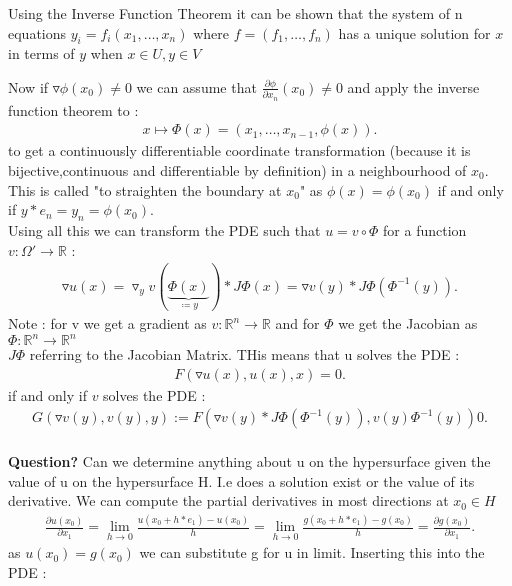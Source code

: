 \begin{corollary}
 Using the Inverse Function Theorem it can be shown that the system of n equations $y_{i}=f_i(x_1,\ldots ,x_n)$ where $f=(f_1,\ldots ,f_n)$  has a unique solution for $x$ in terms of $y$ when $x \in  U , y \in  V$
\end{corollary}
Now if $\triangledown \phi(x_0) \neq 0$ we can assume that $\frac{\partial \phi }{\partial x_n}(x_0) \neq 0 $ and apply the inverse function theorem to : 
\begin{align*}
  x \mapsto \Phi(x) = (x_1,\ldots ,x_{n-1},\phi(x)) 
.\end{align*}
to get a continuously differentiable coordinate transformation (because it is bijective,continuous and differentiable by definition) in a neighbourhood of $x_0$.
This is called "to straighten the boundary at $x_0$" as $\phi(x) = \phi(x_0)$ if and only if $y*e_n = y_n = \phi(x_0)$.\\[1ex]
Using all this we can transform the PDE such that $u = v \circ \Phi $ for a function $v : \Omega' \to  \mathbb{R}$ : 
\begin{align*}
  \triangledown u(x) = \triangledown_{y} v(\underbrace{\Phi(x)}_{\coloneqq y})*J \Phi(x) = \triangledown v(y) * J \Phi(\Phi^{-1}(y))
.\end{align*}
Note : for v we get a gradient as $v : \mathbb{R}^n \to  \mathbb{R}$ and for $\Phi $ we get the Jacobian as $\Phi : \mathbb{R}^n \to  \mathbb{R}^n$\\
$J \Phi$ referring to the Jacobian Matrix. THis means that u solves the PDE :
\begin{align*}
  F(\triangledown u(x),u(x),x) = 0
.\end{align*}
if and only if $v$ solves the PDE : 
\begin{align*}
  G(\triangledown v(y),v(y),y) := F(\triangledown v(y)*J \Phi(\Phi^{-1}(y)),v(y)\Phi^{-1}(y)) 0
.\end{align*}
\\[1ex]
\textbf{Question?} Can we determine anything about u on the hypersurface given the value of u on the hypersurface H.
I.e does a solution exist or the value of its derivative.
We can compute the partial derivatives in most directions at $x_0 \in  H$
\begin{align*}
  \frac{\partial u(x_0)}{\partial x_1} = \lim_{h \to 0}   \frac{u(x_0+h*e_1)-u(x_0)}{h} =  \lim_{h \to 0}   \frac{g(x_0+h*e_1)-g(x_0)}{h} = \frac{\partial g(x_0)}{\partial x_1}
.\end{align*}
as $u(x_0)=g(x_0)$ we can substitute g for u in limit. Inserting this into the PDE : 
